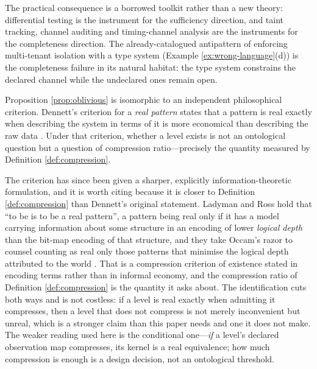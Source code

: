 \begin{remark}
The practical consequence is a borrowed toolkit rather than a new theory: differential testing is
the instrument for the sufficiency direction, and taint tracking, channel auditing and
timing-channel analysis are the instruments for the completeness direction. The
already-catalogued antipattern of enforcing multi-tenant isolation with a type system
(Example \ref{ex:wrong-language}(d)) is the completeness failure in its natural habitat: the type
system constrains the declared channel while the undeclared ones remain open.
\end{remark}

\begin{remark}\label{rmk:dennett}
Proposition \ref{prop:oblivious} is isomorphic to an independent philosophical criterion.
Dennett's criterion for a \emph{real pattern} states that a pattern is real exactly when
describing the system in terms of it is more economical than describing the raw data
\cite{dennett1991}. Under that criterion, whether a level exists is not an ontological
question but a question of compression ratio---precisely the quantity measured by
Definition \ref{def:compression}.

The criterion has since been given a sharper, explicitly information-theoretic formulation, and it
is worth citing because it is closer to Definition \ref{def:compression} than Dennett's original
statement. Ladyman and Ross hold that ``to be is to be a real pattern'', a pattern being real only
if it has a model carrying information about some structure in an encoding of lower \emph{logical
depth} than the bit-map encoding of that structure, and they take Occam's razor to counsel counting
as real only those patterns that minimise the logical depth attributed to the world
\cite{ladyman2007}. That is a compression criterion of existence stated in encoding terms rather
than in informal economy, and the compression ratio of Definition \ref{def:compression} is the
quantity it asks about. The identification cuts both ways and is not costless: if a level is real
exactly when admitting it compresses, then a level that does not compress is not merely inconvenient
but unreal, which is a stronger claim than this paper needs and one it does not make. The weaker
reading used here is the conditional one---\emph{if} a level's declared observation map compresses,
its kernel is a real equivalence; how much compression is enough is a design decision, not an
ontological threshold.


\end{remark}
